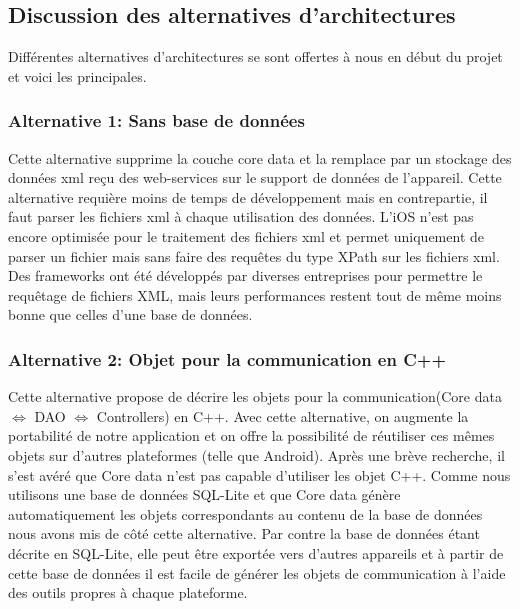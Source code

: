 	\subsection{Discussion des alternatives d'architectures}
		Différentes alternatives d'architectures se sont offertes à nous en début du projet et voici les principales.
		
		\subsubsection{Alternative 1: Sans base de données }
		Cette alternative supprime la couche core data et la remplace par un stockage des données xml reçu des web-services sur le support de données de l'appareil. Cette alternative requière moins de temps de développement mais en contrepartie, il faut parser les fichiers xml à chaque utilisation des données. L'iOS n'est pas encore optimisée pour le traitement des fichiers xml et permet uniquement de parser un fichier mais sans faire des requêtes du type XPath sur les fichiers xml. Des frameworks ont été développés par diverses entreprises pour permettre le requêtage de fichiers XML, mais leurs performances restent tout de même moins bonne que celles d'une base de données.
		
		\subsubsection{Alternative 2: Objet pour la communication en C++ }
		Cette alternative propose de décrire les objets pour la communication(Core data \begin{math} \Leftrightarrow \end{math} DAO  \begin{math} \Leftrightarrow \end{math} Controllers) en C++. Avec cette alternative, on augmente la portabilité de notre application et on offre la possibilité de réutiliser ces mêmes objets sur d'autres plateformes (telle que Android). Après une brève recherche, il s'est avéré que Core data n'est pas capable d'utiliser les objet C++. Comme nous utilisons une base de données SQL-Lite et que Core data génère automatiquement les objets correspondants  au contenu de la base de données nous avons mis de côté cette alternative.  Par contre la base de données étant décrite en SQL-Lite, elle peut être exportée vers d'autres appareils et à partir de cette base de données il est facile de générer les objets de communication à l'aide des outils propres à chaque plateforme.
				
